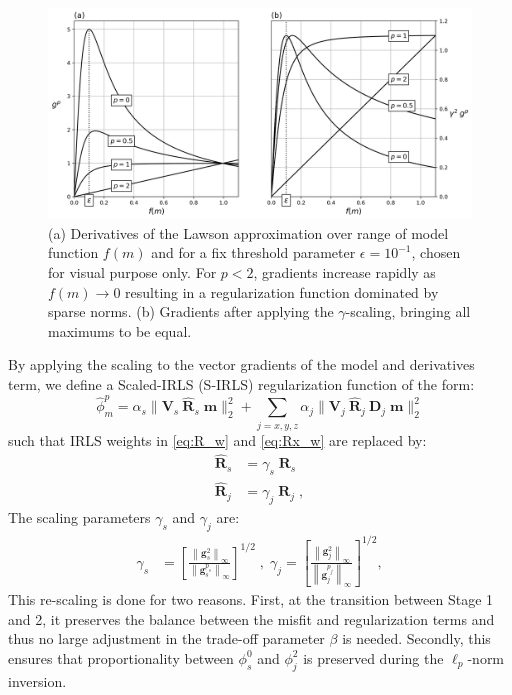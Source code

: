 \documentclass[extra,referee]{gji}
\begin{document}
\begin{figure}
\includegraphics[width=\columnwidth]{Figures/NormDeriv.png}
\caption{(a) Derivatives of the Lawson approximation over range of model function $f(m)$ and for a fix threshold parameter $\epsilon=10^{-1}$, chosen for visual purpose only. For $p<2$, gradients increase rapidly as $f(m) \rightarrow 0$ resulting in a regularization function dominated by sparse norms. (b) Gradients after applying the $\gamma$-scaling, bringing all maximums to be equal.}
\label{NormDeriv}
\end{figure}

By applying the scaling  to the vector gradients of the model and derivatives term, we define a Scaled-IRLS (S-IRLS) regularization function of the form:
\begin{equation}\label{scaledIRLS1D}
\hat \phi^p_m = \alpha_s \| \mathbf{V}_s\:\mathbf{\hat R}_s\; \mathbf{m}\|_2^2 + \sum_{j=x,y,z} \alpha_j\|\mathbf{V}_j\:\mathbf{\hat R}_j\:\mathbf{D}_j\; \mathbf{m}\|_2^2
\end{equation}
such that IRLS weights in \eqref{eq:R_w} and \eqref{eq:Rx_w} are replaced by:
\begin{equation}\label{etaScale}
\begin{split}
\mathbf{\hat R}_s &= \gamma_s\; \mathbf{R}_s \\
\mathbf{\hat R}_j &= \gamma_j\; \mathbf{R}_j \;,
\end{split}
\end{equation}
The scaling parameters $\gamma_s$ and $\gamma_j$ are:
\begin{equation}
\begin{split}
\gamma_s &= \left[\frac{ \left\| \mathbf{g}_s^2 \right\|_\infty}{\left\|\mathbf{g}_s^{p_s}\right\|_\infty}\right]^{1/2} \;,\; \gamma_j = \left[ \frac{ \left\|\mathbf{g}_j^2\right\|_\infty}{\left\|\mathbf{g}_j^{p_j}\right\|_\infty}\right]^{1/2},
\end{split}
\end{equation}
This re-scaling is done for two reasons. First, at the transition between Stage 1 and 2, it preserves the balance between the misfit and regularization terms and thus no large adjustment in the trade-off parameter $\beta$ is needed. Secondly, this ensures that proportionality between $\phi^0_s $ and $\phi^2_j$ is preserved during the $\ell_p$-norm inversion.
\end{document}
